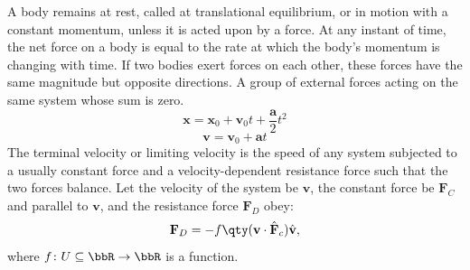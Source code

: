\documentclass[a4paper,12pt]{article}
\begin{document}
A body remains at rest, called at translational equilibrium, or in motion with a constant momentum, unless it is acted upon by a force.
At any instant of time, the net force on a body is equal to the rate at which the body's momentum is changing with time.
If two bodies exert forces on each other, these forces have the same magnitude but opposite directions.
A group of external forces acting on the same system whose sum is zero.
\[\mathbf{x}=\mathbf{x}_0+\mathbf{v}_0t+\frac{\mathbf{a}}{2}t^2\]
\[\mathbf{v}=\mathbf{v}_0+\mathbf{a}t\]
The terminal velocity or limiting velocity is the speed of any system subjected to a usually constant force and a velocity-dependent resistance force such that the two forces balance. Let the velocity of the system be $\mathbf{v}$, the constant force be $\mathbf{F}_C$ and parallel to $\mathbf{v}$, and the resistance force $\mathbf{F}_D$ obey:
\[\mathbf{F}_D=-f\qty(\mathbf{v}\cdot\hat{\mathbf{F}}_c)\hat{\mathbf{v}},\]
where $f\colon U\subseteq\bbR\to\bbR$ is a function.
\end{document}
